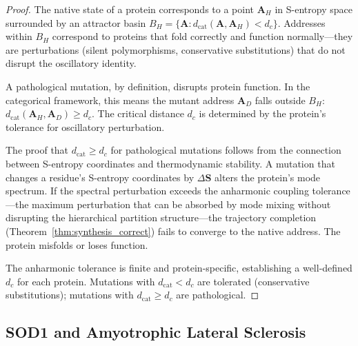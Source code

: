 \documentclass[11pt,twocolumn,a4paper]{article}
\theoremstyle{definition}
\theoremstyle{remark}
\begin{document}
\begin{proof}
The native state of a protein corresponds to a point $\mathbf{A}_H$ in S-entropy space surrounded by an attractor basin $B_H = \{\mathbf{A} : d_{\mathrm{cat}}(\mathbf{A}, \mathbf{A}_H) < d_c\}$. Addresses within $B_H$ correspond to proteins that fold correctly and function normally---they are perturbations (silent polymorphisms, conservative substitutions) that do not disrupt the oscillatory identity.

A pathological mutation, by definition, disrupts protein function. In the categorical framework, this means the mutant address $\mathbf{A}_D$ falls outside $B_H$: $d_{\mathrm{cat}}(\mathbf{A}_H, \mathbf{A}_D) \geq d_c$. The critical distance $d_c$ is determined by the protein's tolerance for oscillatory perturbation.

The proof that $d_{\mathrm{cat}} \geq d_c$ for pathological mutations follows from the connection between S-entropy coordinates and thermodynamic stability. A mutation that changes a residue's S-entropy coordinates by $\Delta\mathbf{S}$ alters the protein's mode spectrum. If the spectral perturbation exceeds the anharmonic coupling tolerance---the maximum perturbation that can be absorbed by mode mixing without disrupting the hierarchical partition structure---the trajectory completion (Theorem~\ref{thm:synthesis_correct}) fails to converge to the native address. The protein misfolds or loses function.

The anharmonic tolerance is finite and protein-specific, establishing a well-defined $d_c$ for each protein. Mutations with $d_{\mathrm{cat}} < d_c$ are tolerated (conservative substitutions); mutations with $d_{\mathrm{cat}} \geq d_c$ are pathological.
\end{proof}

\subsection{SOD1 and Amyotrophic Lateral Sclerosis}
\end{document}
